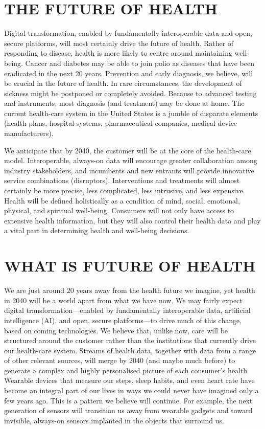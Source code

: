 \documentclass{article}
\begin{document}
\section{THE FUTURE OF HEALTH}

    Digital transformation, enabled by fundamentally interoperable data and open, secure platforms, will most certainly drive the future of health. Rather of responding to disease, health is more likely to centre around maintaining well-being. Cancer and diabetes may be able to join polio as diseases that have been eradicated in the next 20 years. Prevention and early diagnosis, we believe, will be crucial in the future of health. In rare circumstances, the development of sickness might be postponed or completely avoided. Because to advanced testing and instruments, most diagnosis (and treatment) may be done at home. The current health-care system in the United States is a jumble of disparate elements (health plans, hospital systems, pharmaceutical companies, medical device manufacturers).

    We anticipate that by 2040, the customer will be at the core of the health-care model. Interoperable, always-on data will encourage greater collaboration among industry stakeholders, and incumbents and new entrants will provide innovative service combinations (disruptors). Interventions and treatments will almost certainly be more precise, less complicated, less intrusive, and less expensive. Health will be defined holistically as a condition of mind, social, emotional, physical, and spiritual well-being. Consumers will not only have access to extensive health information, but they will also control their health data and play a vital part in determining health and well-being decisions.  

\section{WHAT IS FUTURE OF HEALTH}

    We are just around 20 years away from the health future we imagine, yet health in 2040 will be a world apart from what we have now. We may fairly expect digital transformation—enabled by fundamentally interoperable data, artificial intelligence (AI), and open, secure platforms—to drive much of this change, based on coming technologies. We believe that, unlike now, care will be structured around the customer rather than the institutions that currently drive our health-care system. Streams of health data, together with data from a range of other relevant sources, will merge by 2040 (and maybe much before) to generate a complex and highly personalised picture of each consumer's health. Wearable devices that measure our steps, sleep habits, and even heart rate have become an integral part of our lives in ways we could never have imagined only a few years ago. This is a pattern we believe will continue. For example, the next generation of sensors will transition us away from wearable gadgets and toward invisible, always-on sensors implanted in the objects that surround us.
\end{document}
